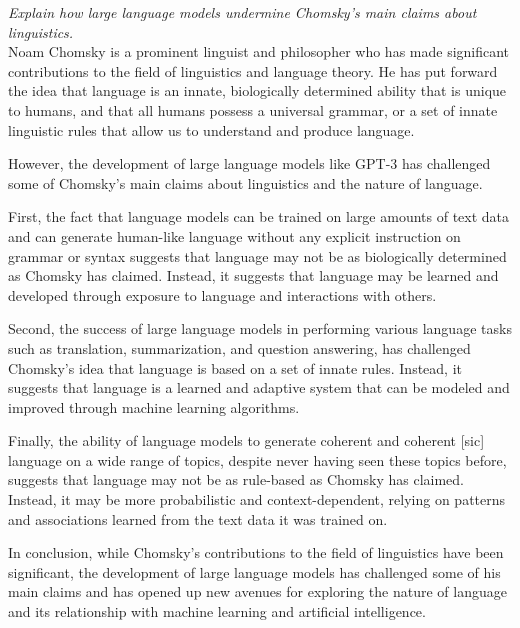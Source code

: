 \documentclass[output=paper,colorlinks,citecolor=brown
]{langscibook}
\begin{document}


\begin{myquote}
\textit{Explain how large language models undermine Chomsky's main claims about linguistics.}\medskip\\
\noindent Noam Chomsky is a prominent linguist and philosopher who has made significant contributions to the field of linguistics and language theory. He has put forward the idea that language is an innate, biologically determined ability that is unique to humans, and that all humans possess a universal grammar, or a set of innate linguistic rules that allow us to understand and produce language.

However, the development of large language models like GPT-3 has challenged some of Chomsky's main claims about linguistics and the nature of language.

First, the fact that language models can be trained on large amounts of text data and can generate human-like language without any explicit instruction on grammar or syntax suggests that language may not be as biologically determined as Chomsky has claimed. Instead, it suggests that language may be learned and developed through exposure to language and interactions with others.

Second, the success of large language models in performing various language tasks such as translation, summarization, and question answering, has challenged Chomsky's idea that language is based on a set of innate rules. Instead, it suggests that language is a learned and adaptive system that can be modeled and improved through machine learning algorithms.

Finally, the ability of language models to generate coherent and coherent [sic] language on a wide range of topics, despite never having seen these topics before, suggests that language may not be as rule-based as Chomsky has claimed. Instead, it may be more probabilistic and context-dependent, relying on patterns and associations learned from the text data it was trained on.

In conclusion, while Chomsky's contributions to the field of linguistics have been significant, the development of large language models has challenged some of his main claims and has opened up new avenues for exploring the nature of language and its relationship with machine learning and artificial intelligence.
\end{myquote}
\end{document}
